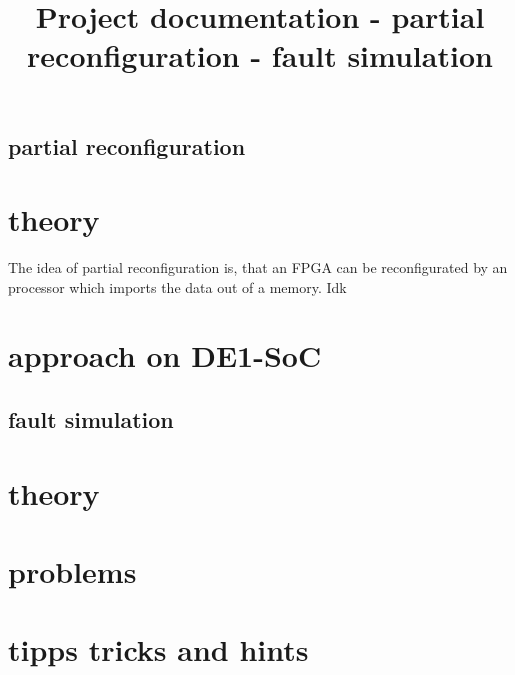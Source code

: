 \documentclass[10pt,a4paper]{report}
\begin{document}
\title{Project documentation - partial reconfiguration - fault simulation}
\section{partial reconfiguration}
\chapter{theory}
The idea of partial reconfiguration is, that an FPGA can be reconfigurated by an processor which imports the data out of a memory.
Idk
\chapter{approach on DE1-SoC}

\section{fault simulation}
\chapter{theory}
\chapter{problems}
\chapter{tipps tricks and hints}
\end{document}

